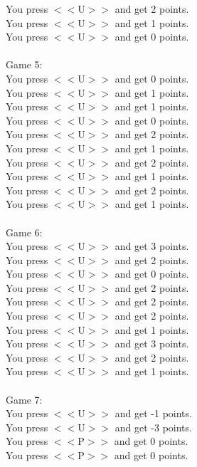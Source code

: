 \documentclass[pdflatex,sn-nature]{sn-jnl}%
\theoremstyle{thmstyleone}%
\theoremstyle{thmstyletwo}%
\theoremstyle{thmstylethree}%
\begin{document}
You press $<<$U$>>$ and get 2 points. $~$\\ 
You press $<<$U$>>$ and get 1 points. $~$\\ 
You press $<<$U$>>$ and get 0 points. $~$\\ 
 $~$\\ 
Game 5: $~$\\ 
You press $<<$U$>>$ and get 0 points. $~$\\ 
You press $<<$U$>>$ and get 1 points. $~$\\ 
You press $<<$U$>>$ and get 1 points. $~$\\ 
You press $<<$U$>>$ and get 0 points. $~$\\ 
You press $<<$U$>>$ and get 2 points. $~$\\ 
You press $<<$U$>>$ and get 1 points. $~$\\ 
You press $<<$U$>>$ and get 2 points. $~$\\ 
You press $<<$U$>>$ and get 1 points. $~$\\ 
You press $<<$U$>>$ and get 2 points. $~$\\ 
You press $<<$U$>>$ and get 1 points. $~$\\ 
 $~$\\ 
Game 6: $~$\\ 
You press $<<$U$>>$ and get 3 points. $~$\\ 
You press $<<$U$>>$ and get 2 points. $~$\\ 
You press $<<$U$>>$ and get 0 points. $~$\\ 
You press $<<$U$>>$ and get 2 points. $~$\\ 
You press $<<$U$>>$ and get 2 points. $~$\\ 
You press $<<$U$>>$ and get 2 points. $~$\\ 
You press $<<$U$>>$ and get 1 points. $~$\\ 
You press $<<$U$>>$ and get 3 points. $~$\\ 
You press $<<$U$>>$ and get 2 points. $~$\\ 
You press $<<$U$>>$ and get 1 points. $~$\\ 
 $~$\\ 
Game 7: $~$\\ 
You press $<<$U$>>$ and get -1 points. $~$\\ 
You press $<<$U$>>$ and get -3 points. $~$\\ 
You press $<<$P$>>$ and get 0 points. $~$\\ 
You press $<<$P$>>$ and get 0 points. $~$\\ 
\end{document}
